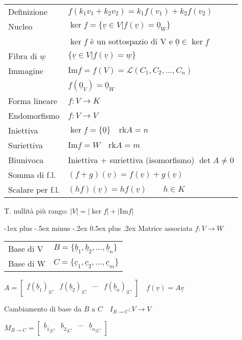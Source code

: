 \documentclass[10pt,landscape]{article}
\makeatletter
\renewcommand{\section}{\@startsection{section}{1}{0mm}%
                                {-1ex plus -.5ex minus -.2ex}%
                                {0.5ex plus .2ex}%
                                {\normalfont\large\bfseries}}
\renewcommand{\vec}[1]{\underline{#1}}
\newcommand{\rk}{\mathrm{rk}}
\newcommand{\Imm}{\mathrm{Im}}
\newcommand{\Lin}{\mathcal{L}}
\makeatother
\begin{document}
\begin{multicols}{3}
\begin{tabular}{l@{\quad}l}
	Definizione & $f(k_1v_1 + k_2v_2) = k_1f(v_1) + k_2f(v_2)$ \\
	Nucleo & $\ker f = \{ \vec{v} \in V | f(\vec{v}) = \vec{0}_{W} \}$ \\
		   & $\ker f$ è un sottospazio di V e $\vec{0} \in \ker f$ \\
	Fibra di $\vec{w}$ & $\{ \vec{v} \in V | f(\vec{v}) = \vec{w} \}$ \\
	Immagine & $\Imm f = f(V) = \Lin(C_1, C_2, ..., C_n)$ \\
			 & $f(\vec{0}_V) = \vec{0}_W$ \\
	Forma lineare & $f: V \rightarrow K$ \\
	Endomorfismo & $f: V \rightarrow V$ \\
	Iniettiva & $\ker f = \{\vec{0}\} \quad \rk A = n$ \\
	Suriettiva & $\Imm f = W \quad \rk A = m$ \\
	Biunivoca & Iniettiva + suriettiva (isomorfismo) $\det A \ne 0$ \\
	Somma di f.l. & $(f+g)(\vec{v}) = f(\vec{v}) + g(\vec{v})$ \\
	Scalare per f.l. & $(hf)(\vec{v}) = hf(\vec{v}) \qquad h \in K$ \\
\end{tabular}

T. nullità più rango: $|V| = |\ker f| + |\Imm f|$

\section{Matrice associata}
$f: V \rightarrow W$

\begin{tabular}{ll}
	Base di V & $B = \{\vec{b}_1, \vec{b}_2, ..., \vec{b}_n\}$ \\
	Base di W & $C = \{\vec{c}_1, \vec{c}_2, ..., \vec{c}_m\}$ \\
\end{tabular} 

$A = \begin{bmatrix} f(\vec{b}_1)_{|C} & f(\vec{b}_2)_{|C} & \cdots & f(\vec{b}_n)_{|C} \end{bmatrix} \quad f(\vec{v}) = A\vec{v}$

\vspace{0.5em}

Cambiamento di base da $B$ a $C \quad I_{B\rightarrow C}: V \rightarrow V$

$M_{B\rightarrow C} = \begin{bmatrix} {\vec{b}_1}_{|C} & {\vec{b}_2}_{|C} & \cdots & {\vec{b}_n}_{|C} \end{bmatrix}$


\end{multicols}
\end{document}
